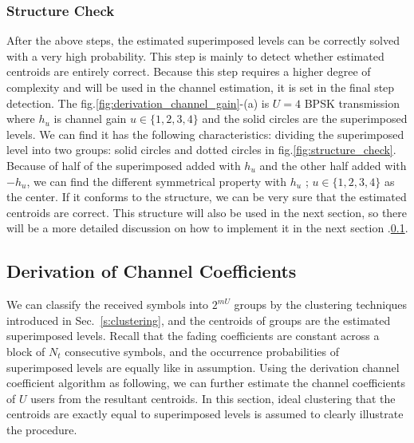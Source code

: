 \subsubsection{Structure Check}

After the above steps, the estimated superimposed levels can be correctly solved with a very high probability. This step is mainly to detect whether estimated centroids are entirely correct. Because this step requires a higher degree of complexity and will be used in the channel estimation, it is set in the final step detection. 
The fig.\ref{fig:derivation_channel_gain}-(a) is $U = 4$ BPSK transmission where $h_u$ is channel gain $u \in \{ 1,2,3,4 \}$ and the solid circles are the superimposed levels. We can find it has the following characteristics: dividing the superimposed level into two groups: solid circles and dotted circles in fig.\ref{fig:structure_check}. Because of half of the superimposed added with $h_u$ and the other half added with  $-h_u$, we can find the different symmetrical property with $h_u$ ; $u \in \{ 1,2,3,4 \}$ as the center. If it conforms to the structure, we can be very sure that the estimated centroids are correct. This structure will also be used in the next section, so there will be a more detailed discussion on how to implement it in the next section .\ref{section:Derivation of Channel Coefficients}.


\subsection{Derivation of Channel Coefficients}
\label{section:Derivation of Channel Coefficients}

We can classify the received symbols into $2^{mU}$ groups by the clustering techniques introduced in Sec.~\ref{s:clustering}, and the centroids of groups are the estimated superimposed levels. Recall that the fading coefficients are constant across a block of $N_t$ consecutive symbols, and the occurrence probabilities of superimposed levels are equally like in assumption. Using the derivation channel coefficient algorithm as following, we can further estimate the channel coefficients of $U$ users from the resultant centroids. In this section, ideal clustering that the centroids are exactly equal to superimposed levels is assumed to clearly illustrate the procedure. 

